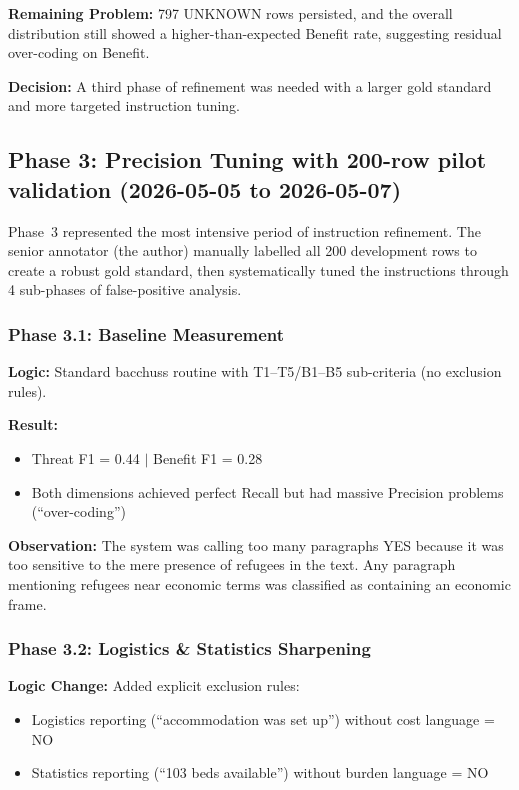 \textbf{Remaining Problem:} 797 UNKNOWN rows persisted, and the overall distribution still showed a higher-than-expected Benefit rate, suggesting residual over-coding on Benefit.

\textbf{Decision:} A third phase of refinement was needed with a larger gold standard and more targeted instruction tuning.

\newpage

\subsection{Phase 3: Precision Tuning with 200-row pilot validation (2026-05-05 to 2026-05-07)}
\label{sec:phase3}

Phase~3 represented the most intensive period of instruction refinement. The senior annotator (the author) manually labelled all 200 development rows to create a robust gold standard, then systematically tuned the instructions through 4 sub-phases of false-positive analysis.

\subsubsection{Phase 3.1: Baseline Measurement}

\textbf{Logic:} Standard bacchuss routine with T1--T5/B1--B5 sub-criteria (no exclusion rules).

\textbf{Result:}
\begin{itemize}
    \item Threat F1 = 0.44 $|$ Benefit F1 = 0.28
    \item Both dimensions achieved perfect Recall but had massive Precision problems (``over-coding'')
\end{itemize}

\textbf{Observation:} The system was calling too many paragraphs YES because it was too sensitive to the mere presence of refugees in the text. Any paragraph mentioning refugees near economic terms was classified as containing an economic frame.

\subsubsection{Phase 3.2: Logistics \& Statistics Sharpening}

\textbf{Logic Change:} Added explicit exclusion rules:
\begin{itemize}
    \item Logistics reporting (``accommodation was set up'') without cost language = NO
    \item Statistics reporting (``103 beds available'') without burden language = NO
\end{itemize}


